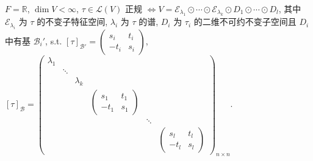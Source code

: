 \documentclass{note}
\begin{document}
\begin{thm}
    $F=\mathbb{R}$, $\dim V<\infty$, $\tau\in\mathcal{L}(V)$ 正规 $\Longleftrightarrow V=\mathcal{E}_{\lambda_1}\odot\cdots\odot\mathcal{E}_{\lambda_k}\odot D_1\odot\cdots\odot D_l$, 其中 $\mathcal{E}_{\lambda_i}$ 为 $\tau$ 的不变子特征空间, ${\lambda_i}$ 为 $\tau$ 的谱, $D_i$ 为 $\tau_i$ 的二维不可约不变子空间且 $D_i$ 中有基 $\mathcal{B}_i'$, s.t. $[\tau]_{\mathcal{B}'}=\begin{pmatrix}
        s_i&t_i\\
        -t_i&s_i
    \end{pmatrix}$,\\
    $[\tau]_{\mathcal{B}}=\begin{pmatrix}
        \lambda_1\\
        &\ddots\\
        &&\lambda_k\\
        &&&\begin{pmatrix}
            s_1&t_1\\
            -t_1&s_1
        \end{pmatrix}\\
        &&&&\ddots\\
        &&&&&\begin{pmatrix}
            s_l&t_l\\
            -t_l&s_l
        \end{pmatrix}
    \end{pmatrix}_{n\times n}$.
\end{thm}
\end{document}
